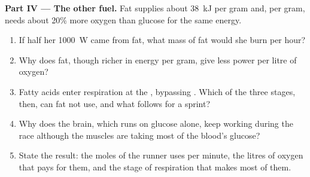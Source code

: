 \begin{problem}
\medskip
\noindent\textbf{Part IV --- The other fuel.}
Fat supplies about \qty{38}{kJ} per gram and, per gram, needs about 20\%
more oxygen than glucose for the same energy.
\begin{enumerate}[resume]
  \item If half her \qty{1000}{W} came from fat, what mass of fat would
        she burn per hour?
  \item Why does fat, though richer in energy per gram, give less
        power per litre of oxygen?
  \item Fatty acids enter respiration at the , bypassing
        . Which of the three stages, then, can fat not use,
        and what follows for a sprint?
  \item Why does the brain, which runs on glucose alone, keep working
        during the race although the muscles are taking most of the
        blood's glucose?
  \item State the result: the moles of  the runner uses per minute,
        the litres of oxygen that pays for them, and the stage of
        respiration that makes most of them.
\end{enumerate}
\end{problem}
